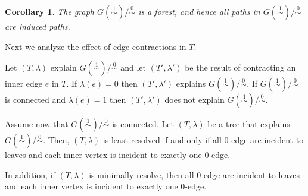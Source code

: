 \documentclass[smallextended]{svjour3}
\newcommand{\rev}[1]{\begingroup\color{blue}#1\endgroup}
\newcommand{\Ro}{\mathrel{\overset{0}{\sim}}}
\newcommand{\Rl}{\mathrel{\overset{1}{\sim}}}
\newtheorem{cor}[thm]{Corollary}
\begin{document}
\begin{cor}
  The graph $G(\Rl)/\Ro$ is a forest, and hence all paths in $G(\Rl)/\Ro$
  are induced paths.
  \label{cor:cycle-free}
\end{cor}

Next we analyze the effect of edge contractions in $T$.

\begin{lemma} \label{lem:contract}
  Let $(T,\lambda)$ explain $G(\Rl)/\Ro$ and let $(T',\lambda')$ be the
  result of contracting an \rev{inner} edge  $e$ in $T$. If $\lambda(e)=0$
  then $(T',\lambda')$ explains $G(\Rl)/\Ro$. If $G(\Rl)/\Ro$ is connected
  and $\lambda(e)=1$ then $(T',\lambda')$ does not explain $G(\Rl)/\Ro$.

\rev{	Assume now that $G(\Rl)/\Ro$ %
		is connected. 
		Let $(T,\lambda)$ be a tree that explains \mbox{$G(\Rl)/\Ro$}. 
      Then, $(T,\lambda)$  is \rev{least resolved} if and only if
      all 0-edge are incident to leaves and each inner vertex 
	   is incident to exactly one 0-edge.

		In addition,  if $(T,\lambda)$ 
		is minimally resolve, then    all 0-edge are incident to leaves
		and each inner vertex 
	   is incident to exactly one 0-edge.
}
\end{lemma}
\end{document}
